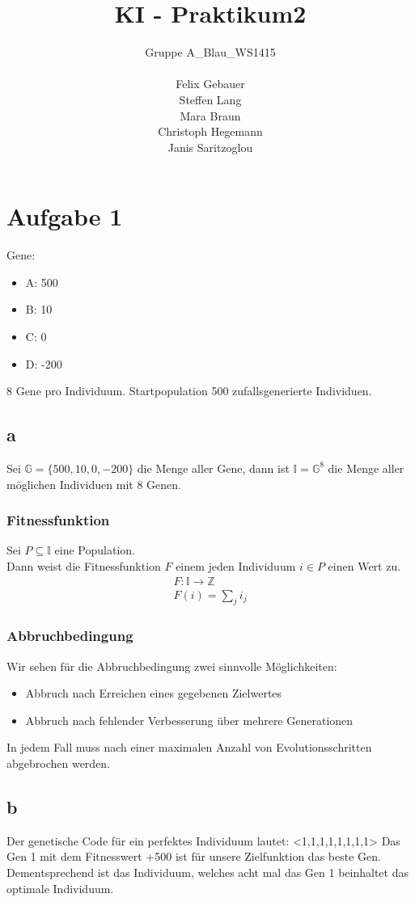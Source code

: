 \documentclass[12pt, a4paper]{article}
\title{KI - Praktikum2}
\author{Gruppe A\_Blau\_WS1415\\\\
    Felix Gebauer\\
    Steffen Lang\\
    Mara Braun\\
    Christoph Hegemann\\
    Janis Saritzoglou}
\begin{document}
\maketitle
\newpage
\section*{Aufgabe 1}
Gene:
\begin{itemize}
\item A: 500
\item B: 10
\item C: 0
\item D: -200
\end{itemize}
8 Gene pro Individuum. Startpopulation 500 zufallsgenerierte
Individuen.

\subsection*{a}
Sei $\mathbb{G} = \{500,10,0,-200\}$ die Menge aller Gene, dann ist
$\mathbb{I} = \mathbb{G}^8$ die Menge aller möglichen Individuen mit 8
Genen.

\subsubsection*{Fitnessfunktion}
Sei $P \subseteq \mathbb{I}$ eine Population.\\
Dann weist die Fitnessfunktion $F$ einem jeden Individuum $i \in P$
einen Wert zu.\\
\begin{align*}
F: \mathbb{I} \longrightarrow \mathbb{Z}\\
F(i) = \sum_j i_j
\end{align*}

\subsubsection*{Abbruchbedingung}
Wir sehen für die Abbruchbedingung zwei sinnvolle Möglichkeiten:
\begin{itemize}
\item Abbruch nach Erreichen eines gegebenen Zielwertes
\item Abbruch nach fehlender Verbesserung über mehrere Generationen
\end{itemize}
In jedem Fall muss nach einer maximalen Anzahl von Evolutionsschritten
abgebrochen werden.

\subsection*{b}
Der genetische Code für ein perfektes Individuum lautet: <1,1,1,1,1,1,1,1>
Das Gen 1 mit dem Fitnesswert +500 ist für unsere Zielfunktion das beste Gen. Dementsprechend ist das Individuum, welches acht mal das Gen 1 beinhaltet das optimale Individuum.
\end{document}
